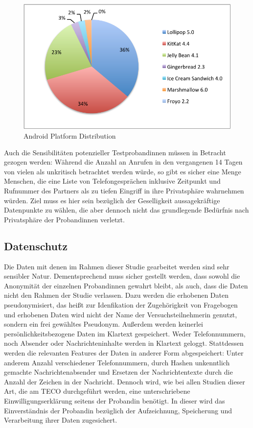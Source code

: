 \begin{figure}[h]
    \centering
    \includegraphics{images/chart.pdf}
    \caption{Android Platform Distribution\cite{androiddistr}}
    \label{fig:androidplatformdistr}
\end{figure}

Auch die Sensibilitäten potenzieller Testprobandinnen müssen in Betracht gezogen werden:
Während die Anzahl an Anrufen in den vergangenen 14 Tagen von vielen als unkritisch betrachtet werden würde, so gibt es sicher eine Menge Menschen, 
die eine Liste von Telefongesprächen inklusive Zeitpunkt und Rufnummer des Partners als zu tiefen Eingriff in ihre Privatsphäre wahrnehmen würden.
Ziel muss es hier sein bezüglich der Geselligkeit aussagekräftige Datenpunkte zu wählen, 
die aber dennoch nicht das grundlegende Bedürfnis nach Privatsphäre der Probandinnen verletzt.


\subsection{Datenschutz}

Die Daten mit denen im Rahmen dieser Studie gearbeitet werden sind sehr sensibler Natur.
Dementsprechend muss sicher gestellt werden, dass sowohl die Anonymität der einzelnen Probandinnen gewahrt bleibt,
als auch, dass die Daten nicht den Rahmen der Studie verlassen.
Dazu werden die erhobenen Daten pseudonymisiert, das heißt zur Idenfikation der Zugehörigkeit von Fragebogen und erhobenen Daten wird nicht der Name der Versuchsteilnehmerin genutzt, sondern ein frei gewähltes Pseudonym.
Außerdem werden keinerlei persönlichkeitsbezogene Daten im Klartext gespeichert.
Weder Telefonnummern, noch Absender oder Nachrichteninhalte werden in Klartext geloggt.
Stattdessen werden die relevanten Features der Daten in anderer Form abgespeichert:
Unter anderem Anzahl verschiedener Telefonnummern, durch Hashen unkenntlich gemachte Nachrichtenabsender und Ersetzen der Nachrichtentexte durch die Anzahl der Zeichen in der Nachricht.
Dennoch wird, wie bei allen Studien dieser Art, die am TECO durchgeführt werden,
eine unterschriebene Einwilligungserklärung seitens der Probandin benötigt.
In dieser wird das Einverständnis der Probandin bezüglich der Aufzeichnung, Speicherung und Verarbeitung ihrer Daten zugesichert.
\par



